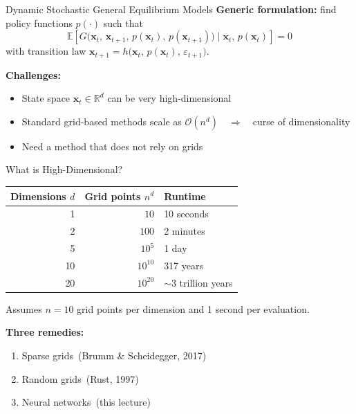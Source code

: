 \documentclass[aspectratio=169,11pt]{beamer}
\newcommand{\emphc}[1]{\textcolor{harvardcrimson}{#1}}
\newcommand{\x}{\bm{x}}
\newcommand{\R}{\mathbb{R}}
\newcommand{\E}[1]{\mathbb{E}\!\left[#1\right]}
\begin{document}
\begin{frame}{Dynamic Stochastic General Equilibrium Models}
\textbf{Generic formulation:} find policy functions $p(\cdot)$ such that
\[
\E{G\bigl(\x_t,\,\x_{t+1},\,p(\x_t),\,p(\x_{t+1})\bigr) \;\Big|\; \x_t,\,p(\x_t)} = 0
\]
with transition law $\x_{t+1} = h\bigl(\x_t,\,p(\x_t),\,\varepsilon_{t+1}\bigr)$.

\vspace{0.6em}
\textbf{Challenges:}
\begin{itemize}
    \item State space $\x_t \in \R^d$ can be \emphc{very high-dimensional}
    \item Standard grid-based methods scale as $\mathcal{O}(n^d)$~~$\Rightarrow$~~\emphc{curse of dimensionality}
    \item Need a method that \emphc{does not rely on grids}
\end{itemize}
\end{frame}

\begin{frame}{What is High-Dimensional?}
\begin{center}
\begin{tabular}{rrl}
\toprule
\textbf{Dimensions $d$} & \textbf{Grid points $n^d$} & \textbf{Runtime} \\
\midrule
1 & $10$ & 10 seconds \\
2 & $100$ & 2 minutes \\
5 & $10^5$ & 1 day \\
10 & $10^{10}$ & 317 years \\
20 & $10^{20}$ & $\sim 3$ trillion years \\
\bottomrule
\end{tabular}
\end{center}

\vspace{0.5em}
{\small Assumes $n = 10$ grid points per dimension and 1 second per evaluation.}

\vspace{0.5em}
\textbf{Three remedies:}
\begin{enumerate}
    \item \emphc{Sparse grids}~(Brumm \& Scheidegger, 2017)
    \item \emphc{Random grids}~(Rust, 1997)
    \item \emphc{Neural networks}~(this lecture)
\end{enumerate}
\end{frame}
\end{document}
